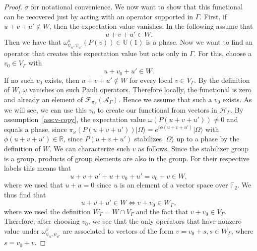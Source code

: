 \documentclass[aps,pra,reprint,superscriptaddress]{revtex4-2}
\newcommand{\cA}{{\mathcal A}}
\newcommand{\cF}{{\mathcal F}}
\newcommand{\cH}{{\mathcal H}}
\newcommand\G{\Gamma}
\newcommand\s{\sigma}
\newcommand\w{\omega}
\newcommand\W{\Omega}
\newcommand\y{\psi}
\providecommand{\ket}[1]{\lvert #1\rangle}
\theoremstyle{definition}
\theoremstyle{remark}
\begin{document}
\begin{proof}
        $\s$ for notational convenience.
        We now want to show that this functional can be
        recovered just by acting with an operator supported in $\G$. First, if
        $u+v+u' \notin W$, then the expectation value vanishes. In the
        following assume that 
        \begin{equation}\label{ass:v-copy}            
        u + v + u' \in W.
        \end{equation}
        Then we have that $\w^{\pi}_{\y_u,\y_{u'}}(P(v)) \in \mathrm{U}(1)$ is
        a phase.
        Now we want to find an
        operator that creates this expectation value but acts only in $\G$. For
        this, choose a $v_0 \in V_\G$ with
        \begin{equation}\label{ass:v_0-copy}
            u + v_0 + u' \in W.
        \end{equation}
        If no such $v_0$ exists, then $u+v+u'\notin W$ for every local $v\in
        V_\G$. By the definition of $W$, $\w$ vanishes on such Pauli operators.
        Therefore locally, the functional is zero and already an element of
        $\cF_{\pi_\G}(\cA_\G)$. Hence we assume that such a $v_0$ exists.
        As we will see, we can use this $v_0$ to create our functional from
        vectors in $\cH_{\G}$.
        By assumption~\eqref{ass:v-copy}, the expectation value $\w(P(u+v+u'))
        \neq 0$ and equals a phase, since $\pi_\w(P(u+v+u'))\ket{\W} =
        e^{i\phi(u+v+u')}\ket{\W}$ with $\phi(u+v+u') \in \mathbb{R}$, since
        $P(u+v+u')$ stabilizes $\ket{\W}$ up to a phase by the definition of
        $W$. We can characterize such $v$ as follows. Since the stabilizer
        group is a group, products of group elements are also in the group. For
        their respective labels this means that
        \begin{equation}
            u+v+u'+u+v_0 +u' = v_0 + v \in W,
        \end{equation}
        where we used that $u+u = 0$ since $u$ is an element of a vector space
        over $\mathbb{F}_2$. We thus find that
        \begin{equation}
            u + v + u' \in W \Leftrightarrow  v + v_0 \in W_\G,
        \end{equation}
        where we used the definition $W_\G=W\cap V_\G$ and the fact that
        $v+v_0\in V_\G$.
        Therefore, after choosing $v_0$, we see that the only operators that have nonzero
        value under $\w_{\y_u, \y_{u'}}^{\pi}$ are associated to vectors of the
        form $v = v_0 + s, s \in W_\G$, where $s = v_0 + v$.

\end{proof}
\end{document}
